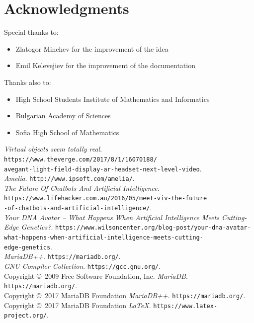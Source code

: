 \documentclass[a4paper, 12pt]{article}
\begin{document}
 	\section{Acknowledgments}
 	 	 Special thanks to:
 	 	 \begin{itemize}
 	 	 	\item Zlatogor Minchev for the improvement of the idea
 	 	 	\item Emil Kelevejiev for the improvement of the documentation
 	 	 \end{itemize}
 	 	 Thanks also to:
 	 	 \begin{itemize}
 	 	 	\item High School Students Institute of Mathematics and Informatics
 	 	 	\item Bulgarian Academy of Sciences
 	 	 	\item Sofia High School of Mathematics
 	 	 \end{itemize}
 	 	 \begin{thebibliography}{99}
 	 	 	{\itshape Virtual objects seem totally real}.
 	 	 	\texttt{https://www.theverge.com/2017/8/1/16070188/\\
 	 	 	        avegant-light-field-display-ar-headset-next-level-video}. \\
 	 	 	{\itshape Amelia}.
 	 	 	\texttt{http://www.ipsoft.com/amelia/}. \\
 	 	 	{\itshape The Future Of Chatbots And Artificial Intelligence}.
 	 	 	\texttt{https://www.lifehacker.com.au/2016/05/meet-viv-the-future\\
 	 	 		-of-chatbots-and-artificial-intelligence/}. \\
 	 	 	
 	 	 	{\itshape Your DNA Avatar – What Happens When Artificial Intelligence Meets Cutting-Edge Genetics?}.
 	 	 	\texttt{https://www.wilsoncenter.org/blog-post/your-dna-avatar-\\
 	 	 		    what-happens-when-artificial-intelligence-meets-cutting-\\
 	 	 		    edge-genetics}. \\
 	 	 	
 	 	 	{\itshape MariaDB++}.
 	 	 	\texttt{https://mariadb.org/}. \\
 	 	 	{\itshape GNU Compiler Collection}.
 	 	 	\texttt{https://gcc.gnu.org/}. \\
 	 	 	Copyright \copyright\  2009 Free Software Foundation, Inc.
 	 	 	{\itshape MariaDB}.
 	 	 	\texttt{https://mariadb.org/}. \\
 	 	 	Copyright \copyright\  2017 MariaDB Foundation
 	 	 	{\itshape MariaDB++}.
 	 	 	\texttt{https://mariadb.org/}. \\
 	 	 	Copyright \copyright\  2017 MariaDB Foundation
 	 	 	{\itshape \LaTeX}.
 	 	 	\texttt{https://www.latex-project.org/}.
 	 	 \end{thebibliography}
\end{document}
